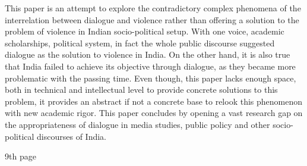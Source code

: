 \begin{multicols}{2}

\noi
This paper is an attempt to explore the contradictory complex phenomena of the interrelation
between dialogue and violence rather than offering a solution to the problem of violence in Indian
socio-political setup. With one voice, academic scholarships, political system, in fact the whole
public discourse suggested dialogue as the solution to violence in India. On the other hand, it is
also true that India failed to achieve its objective through dialogue, as they became more
problematic with the passing time. Even though, this paper lacks enough space, both in technical
and intellectual level to provide concrete solutions to this problem, it provides an abstract if not a
concrete base to relook this phenomenon with new academic rigor. This paper concludes by
opening a vast research gap on the appropriateness of dialogue in media studies, public policy
and other socio-political discourses of India.


9th page

\end{multicols}
